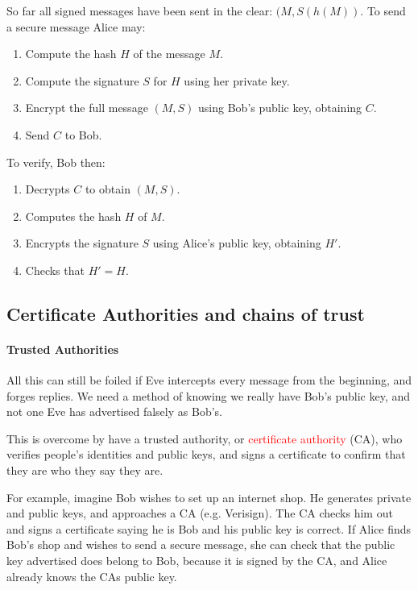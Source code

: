 \documentclass[a4paper, 11pt, openany]{book}
\numberwithin{equation}{section}
\theoremstyle{plain}
\theoremstyle{definition}
\newcommand{\Important}[1]{\textcolor{red}{#1}}
\begin{document}
So far all signed messages have been sent in the clear: $(M, S(h(M) )$. To send a secure message Alice may:
\begin{enumerate}
    \item Compute the hash $H$ of the message $M$.
    
    \item Compute the signature $S$ for $H$ using her private key.
    
    \item Encrypt the full message $(M,S)$ using Bob's public key, obtaining $C$.
    
    \item Send $C$ to Bob.
\end{enumerate}

To verify, Bob then:
\begin{enumerate}
    \item Decrypts $C$ to obtain $(M,S)$.
    
    \item Computes the hash $H$ of $M$.
    
    \item Encrypts the signature $S$ using Alice's public key, obtaining $H'$.
    
    \item Checks that $H' = H$.
\end{enumerate}

\subsection{Certificate Authorities and chains of trust}

\paragraph{Trusted Authorities}

All this can still be foiled if Eve intercepts every message from the beginning, and forges replies.
We need a method of knowing we really have Bob's public key, and not one Eve has advertised falsely as Bob's.

This is overcome by have a trusted authority, or \Important{certificate authority} (CA), who verifies people's identities and public keys, and signs a certificate to confirm that they are who they say they are.

For example, imagine Bob wishes to set up an internet shop. He generates private and public keys, and approaches a CA (e.g. Verisign). The CA checks him out and signs a certificate saying he is Bob and his public key is correct. If Alice finds Bob's shop and wishes to send a secure message, she can check that the public key advertised does belong to Bob, because it is signed by the CA, and Alice already knows the CAs public key.
\end{document}
